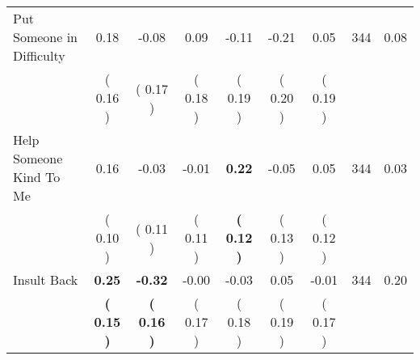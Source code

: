 \begin{tabular}{lcccccccc}
Put Someone in Difficulty &      0.18 &     -0.08 &      0.09 &     -0.11 &     -0.21 &      0.05 & 344 &       0.08 \\ 
 & (     0.16 ) & (     0.17 ) & (     0.18 ) & (     0.19 ) & (     0.20 ) & (     0.19 ) & \\
Help Someone Kind To Me &      0.16 &     -0.03 &     -0.01 & \textbf{     0.22} &     -0.05 &      0.05 & 344 &       0.03 \\ 
 & (     0.10 ) & (     0.11 ) & (     0.11 ) & \textbf{(     0.12 )} & (     0.13 ) & (     0.12 ) & \\
Insult Back & \textbf{     0.25} & \textbf{    -0.32} &     -0.00 &     -0.03 &      0.05 &     -0.01 & 344 &       0.20 \\ 
 & \textbf{(     0.15 )} & \textbf{(     0.16 )} & (     0.17 ) & (     0.18 ) & (     0.19 ) & (     0.17 ) & \\
\bottomrule
\end{tabular}
